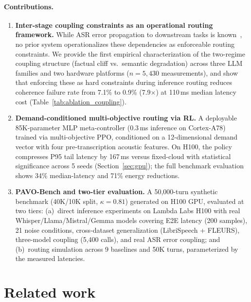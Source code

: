 \documentclass{article}
\begin{document}
\paragraph{Contributions.}
\begin{enumerate}[leftmargin=*,itemsep=2pt]
\item \textbf{Inter-stage coupling constraints as an operational routing framework.} While ASR error propagation to downstream tasks is known~\citep{errattahi2018asr}, no prior system operationalizes these dependencies as enforceable routing constraints. We provide the first empirical characterization of the two-regime coupling structure (factual cliff vs.\ semantic degradation) across three LLM families and two hardware platforms ($n=5{,}430$ measurements), and show that enforcing these as hard constraints during inference routing reduces coherence failure rate from 7.1\% to 0.9\% (7.9$\times$) at 110\,ms median latency cost (Table~\ref{tab:ablation_coupling}).

\item \textbf{Demand-conditioned multi-objective routing via RL.} A deployable 85K-parameter MLP meta-controller (0.3\,ms inference on Cortex-A78) trained via multi-objective PPO, conditioned on a 12-dimensional demand vector with four pre-transcription acoustic features. On H100, the policy compresses P95 tail latency by 167\,ms versus fixed-cloud with statistical significance across 5 seeds (Section~\ref{sec:gpu}); the full benchmark evaluation shows 34\% median-latency and 71\% energy reductions.

\item \textbf{PAVO-Bench and two-tier evaluation.} A 50{,}000-turn synthetic benchmark (40K/10K split, $\kappa=0.81$) generated on H100 GPU, evaluated at two tiers: (a)~direct inference experiments on Lambda Labs H100 with real Whisper/Llama/Mistral/Gemma models covering E2E latency (200 samples), 21 noise conditions, cross-dataset generalization (LibriSpeech + FLEURS), three-model coupling (5{,}400 calls), and real ASR error coupling; and (b)~routing simulation across 9 baselines and 50K turns, parameterized by the measured latencies.
\end{enumerate}

\section{Related work}
\label{sec:related}
\end{document}
